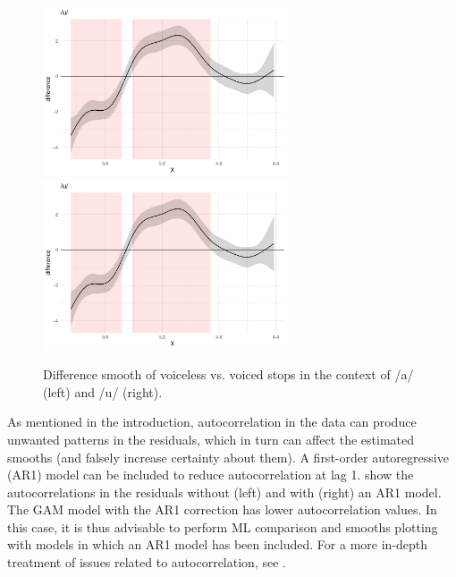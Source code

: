 \documentclass[11pt,]{article}
\begin{document}
\begin{figure}

{\centering \includegraphics[width=.7\linewidth,height=5cm]{2018-polar-gam_files/figure-latex/Figure04} \includegraphics[width=.7\linewidth,height=5cm]{2018-polar-gam_files/figure-latex/Figure04} 

}

\caption{Difference smooth of voiceless vs. voiced stops in the context of /a/ (left) and /u/ (right).}\label{f:Figure04}
\end{figure}

As mentioned in the introduction, autocorrelation in the data can
produce unwanted patterns in the residuals, which in turn can affect the
estimated smooths (and falsely increase certainty about them). A
first-order autoregressive (AR1) model can be included to reduce
autocorrelation at lag 1.  show the autocorrelations in
the residuals without (left) and with (right) an AR1 model. The GAM
model with the AR1 correction has lower autocorrelation values. In this
case, it is thus advisable to perform ML comparison and smooths plotting
with models in which an AR1 model has been included. For a more in-depth
treatment of issues related to autocorrelation, see
\citet{soskuthy2017}.
\end{document}
